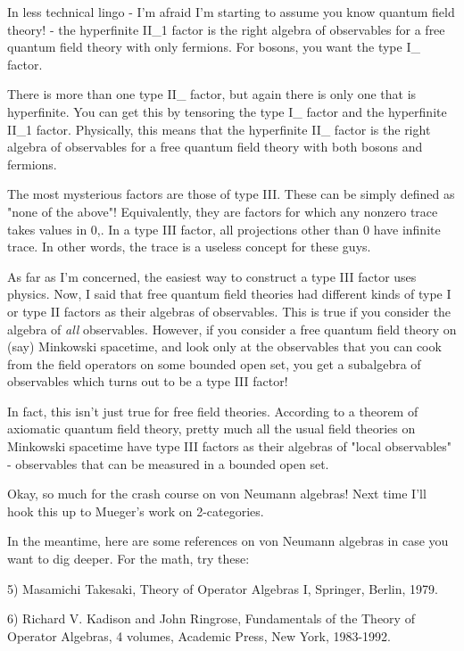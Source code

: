 In less technical lingo - I'm afraid I'm starting to assume you know
quantum field theory! - the hyperfinite II_{1} factor is the
right algebra of observables for a free quantum field theory with only
fermions.  For bosons, you want the type I_{\infty } factor.

There is more than one type II_{\infty } factor, but again
there is only one that is hyperfinite.  You can get this by tensoring
the type I_{\infty } factor and the hyperfinite II_{1}
factor.  Physically, this means that the hyperfinite
II_{\infty } factor is the right algebra of observables for a
free quantum field theory with both bosons and fermions.

The most mysterious factors are those of type III.  These can be simply
defined as "none of the above"!  Equivalently, they are factors for 
which any nonzero trace takes values in {0,\infty }.  In a type III
factor, all projections other than 0 have infinite trace.  In other
words, the trace is a useless concept for these guys.  

As far as I'm concerned, the easiest way to construct a type III factor
uses physics.  Now, I said that free quantum field theories had
different kinds of type I or type II factors as their algebras of
observables.  This is true if you consider the algebra of \emph{all}
observables. However, if you consider a free quantum field theory on
(say) Minkowski spacetime, and look only at the observables that you can
cook from the field operators on some bounded open set, you get a
subalgebra of observables which turns out to be a type III factor!  

In fact, this isn't just true for free field theories.  According to a
theorem of axiomatic quantum field theory, pretty much all the usual
field theories on Minkowski spacetime have type III factors as their
algebras of "local observables" - observables that can be measured in
a bounded open set.  

Okay, so much for the crash course on von Neumann algebras!  Next time
I'll hook this up to Mueger's work on 2-categories.

In the meantime, here are some references on von Neumann algebras in
case you want to dig deeper.  For the math, try these:

5) Masamichi Takesaki, Theory of Operator Algebras I, Springer, 
Berlin, 1979.

6) Richard V. Kadison and John Ringrose, Fundamentals of the
Theory of Operator Algebras, 4 volumes, Academic Press, New York,
1983-1992.

